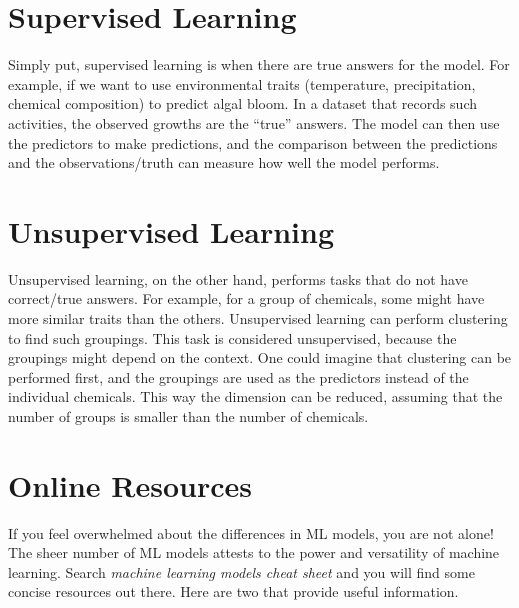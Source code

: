 \documentclass[
]{book}
\begin{document}
\hypertarget{supervised-learning}{%
\section{Supervised Learning}\label{supervised-learning}}

Simply put, supervised learning is when there are true answers for the model. For example, if we want to use environmental traits (temperature, precipitation, chemical composition) to predict algal bloom. In a dataset that records such activities, the observed growths are the ``true'' answers. The model can then use the predictors to make predictions, and the comparison between the predictions and the observations/truth can measure how well the model performs.

\hypertarget{unsupervised-learning}{%
\section{Unsupervised Learning}\label{unsupervised-learning}}

Unsupervised learning, on the other hand, performs tasks that do not have correct/true answers. For example, for a group of chemicals, some might have more similar traits than the others. Unsupervised learning can perform clustering to find such groupings. This task is considered unsupervised, because the groupings might depend on the context. One could imagine that clustering can be performed first, and the groupings are used as the predictors instead of the individual chemicals. This way the dimension can be reduced, assuming that the number of groups is smaller than the number of chemicals.

\hypertarget{online-resources}{%
\section{Online Resources}\label{online-resources}}

If you feel overwhelmed about the differences in ML models, you are not alone! The sheer number of ML models attests to the power and versatility of machine learning. Search \emph{machine learning models cheat sheet} and you will find some concise resources out there. Here are two that provide useful information.
\end{document}
